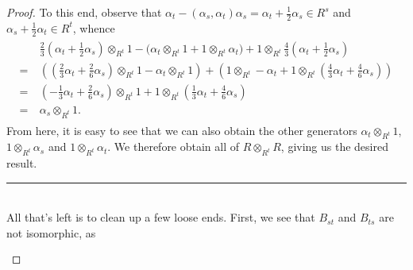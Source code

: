 \begin{proof}
\noindent To this end, observe that $\alpha_t - (\alpha_s, \alpha_t)\alpha_s = \alpha_t + \frac{1}{2}\alpha_s \in R^s$ and $\alpha_s + \frac{1}{2}\alpha_t \in R^t$, whence
\begin{align*}
\begin{split}
&\frac{2}{3}\left(\alpha_t + \frac{1}{2}\alpha_s\right) \otimes_{R^t} 1 - \bigg(\alpha_t \otimes_{R^t} 1 + 1 \otimes_{R^t} \alpha_t\bigg) + 1 \otimes_{R^t} \frac{4}{3}\left(\alpha_t + \frac{1}{2}\alpha_s\right)\\
=\ &\left(\left(\frac{2}{3}\alpha_t + \frac{2}{6}\alpha_s\right) \otimes_{R^t} 1 - \alpha_t \otimes_{R^t} 1\right) + \left(1 \otimes_{R^t} -\alpha_t + 1 \otimes_{R^t} \left(\frac{4}{3}\alpha_t + \frac{4}{6}\alpha_s\right)\right)\\
=\ &\left(-\frac{1}{3}\alpha_t + \frac{2}{6}\alpha_s\right) \otimes_{R^t} 1 + 1 \otimes_{R^t} \left(\frac{1}{3}\alpha_t + \frac{4}{6}\alpha_s\right)\\
=\ &\alpha_s \otimes_{R^t} 1.
\end{split}
\end{align*}
\noindent From here, it is easy to see that we can also obtain the other generators $\alpha_t \otimes_{R^t} 1$, $1 \otimes_{R^t} \alpha_s$ and $1 \otimes_{R^t} \alpha_t$. We therefore obtain all of $R \otimes_{R^t} R$, giving us the desired result.\\[-1.5\baselineskip]
\begin{center}
\rule{0.5\linewidth}{1pt}
\end{center}
\noindent\\[-\baselineskip] All that's left is to clean up a few loose ends. First, we see that $B_{st}$ and $B_{ts}$ are not isomorphic, as
\begin{align*}
\begin{split}

\end{split}
\end{align*}
\end{proof}
